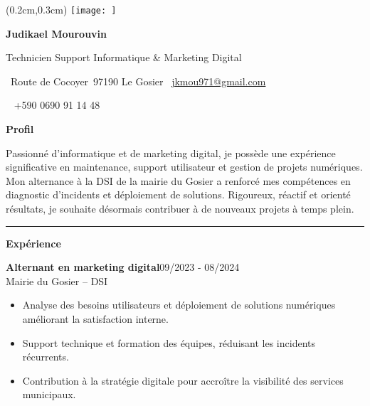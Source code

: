 \documentclass[a4paper]{article}
\renewcommand{\colorbox}[2]{#2}%
\newcommand{\fullrule}{\hspace{-1.5cm}\rule{\paperwidth}{0.4pt}}
\newcommand{\cvsection}[1]{%
  \vspace{6pt}\textbf{\Large #1}\par\vspace{2pt}}
\begin{document}
\color{white}
\ifx\relax\relax\else
\begin{textblock*}{4cm}(0.2cm,0.3cm)
  \texttt{[image: ]}
\end{textblock*}
 \fi
\begin{center}
  {\fontsize{44pt}{24pt}\selectfont\bfseries Judikael Mourouvin}

  \bigskip
  {\Large Technicien Support Informatique \& Marketing Digital}

  \bigskip\bigskip
  \faMapMarker~Route de Cocoyer\ 97190 Le Gosier
  \quad\faEnvelope~\href{mailto:jkmou971@gmail.com}{jkmou971@gmail.com}

  \bigskip
  \faPhone~ +590 0690 91 14 48
  \quad \faLinkedin\ \href{}{}
 

  \vspace{-0.3cm}
  
\end{center}
 \vspace{2cm}
\cvsection{Profil}

Passionné d’informatique et de marketing digital, je possède une expérience significative en maintenance, support utilisateur et gestion de projets numériques. Mon alternance à la DSI de la mairie du Gosier a renforcé mes compétences en diagnostic d’incidents et déploiement de solutions. Rigoureux, réactif et orienté résultats, je souhaite désormais contribuer à de nouveaux projets à temps plein.

\medskip\fullrule

\cvsection{Expérience}
\colorbox{maincolor}{%
  \begin{minipage}{\linewidth}
    \noindent
    \textbf{Alternant en marketing digital}\hfill 09/2023 - 08/2024\\
    Mairie du Gosier – DSI\\[-0.3em]
    \begin{itemize}[leftmargin=*]
      \item Analyse des besoins utilisateurs et déploiement de solutions numériques améliorant la satisfaction interne. \item Support technique et formation des équipes, réduisant les incidents récurrents. \item Contribution à la stratégie digitale pour accroître la visibilité des services municipaux.
    \end{itemize}
  \end{minipage}}
\end{document}
